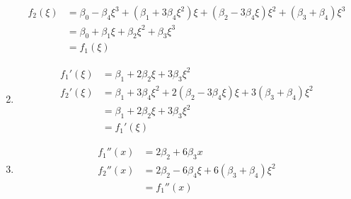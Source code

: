 \documentclass{article}
\begin{document}
\begin{enumerate}[label=(\alph*)]
\begin{align*}
    f_2(\xi) &= \beta_0 - \beta_4 \xi^3 + (\beta_1 + 3\beta_4 \xi^2)\xi + (\beta_2 - 3\beta_4 \xi)\xi^2 + (\beta_3 + \beta_4)\xi^3 \\
    &= \beta_0 + \beta_1 \xi + \beta_2 \xi^2 + \beta_3 \xi^3 \\
    &= f_1(\xi)
\end{align*}
\item
\begin{align*}
    f_1'(\xi) &= \beta_1 + 2\beta_2 \xi + 3\beta_3 \xi^2 \\
    f_2'(\xi) &= \beta_1 + 3\beta_4 \xi^2 + 2(\beta_2 - 3\beta_4 \xi)\xi + 3(\beta_3 + \beta_4)\xi^2 \\
    &= \beta_1 + 2\beta_2 \xi + 3\beta_3 \xi^2 \\
    &= f_1'(\xi)
\end{align*}
\item
\begin{align*}
    f_1''(x) &= 2\beta_2 + 6\beta_3 x \\
    f_2''(x) &= 2\beta_2 - 6\beta_4 \xi + 6(\beta_3 + \beta_4)\xi^2 \\
    &= f_1''(x)
\end{align*}
\end{enumerate}

\newpage
\end{document}
